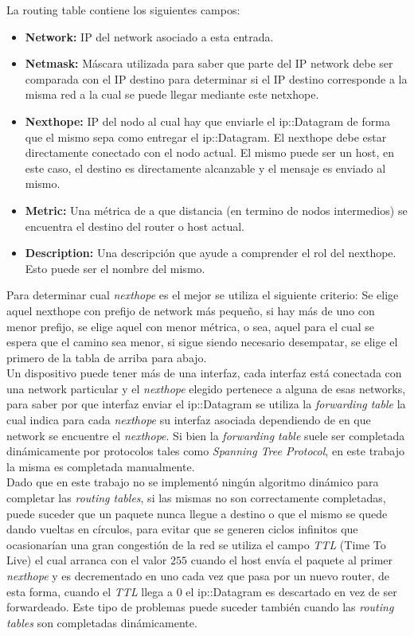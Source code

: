 \documentclass[10pt,a4paper]{article}
\begin{document}
La routing table contiene los siguientes campos:
\begin{itemize}
\item \textbf{Network:} IP del network asociado a esta entrada.
\item \textbf{Netmask:} Máscara utilizada para saber que parte del IP network debe ser comparada con el IP destino para determinar si el IP destino corresponde a la misma red a la cual se puede llegar mediante este netxhope.
\item \textbf{Nexthope:} IP del nodo al cual hay que enviarle el ip::Datagram de forma que el mismo sepa como entregar el ip::Datagram. El nexthope debe estar directamente conectado con el nodo actual. El mismo puede ser un host, en este caso, el destino es directamente alcanzable y el mensaje es enviado al mismo.
\item \textbf{Metric:} Una métrica de a que distancia (en termino de nodos intermedios) se encuentra el destino del router o host actual.
\item \textbf{Description:} Una descripción que ayude a comprender el rol del nexthope. Esto puede ser el nombre del mismo.
\end{itemize}

Para determinar cual \textit{nexthope} es el mejor se utiliza el siguiente criterio: Se elige aquel nexthope con prefijo de network más pequeño, si hay más de uno con menor prefijo, se elige aquel con menor métrica, o sea, aquel para el cual se espera que el camino sea menor, si sigue siendo necesario desempatar, se elige el primero de la tabla de arriba para abajo. \\

Un dispositivo puede tener más de una interfaz, cada interfaz está conectada con una network particular y el \textit{nexthope} elegido pertenece a alguna de esas networks, para saber por que interfaz enviar el ip::Datagram se utiliza la \textit{forwarding table} la cual indica para cada \textit{nexthope} su interfaz asociada dependiendo de en que network se encuentre el \textit{nexthope}. Si bien la \textit{forwarding table} suele ser completada dinámicamente por protocolos tales como \textit{Spanning Tree Protocol}, en este trabajo la misma es completada manualmente. \\

Dado que en este trabajo no se implementó ningún algoritmo dinámico para completar las \textit{routing tables}, si las mismas no son correctamente completadas, puede suceder que un paquete nunca llegue a destino o que el mismo se quede dando vueltas en círculos, para evitar que se generen ciclos infinitos que ocasionarían una gran congestión de la red se utiliza el campo \textit{TTL} (Time To Live) el cual arranca con el valor $255$ cuando el host envía el paquete al primer \textit{nexthope} y es decrementado en uno cada vez que pasa por un nuevo router, de esta forma, cuando el \textit{TTL} llega a $0$ el ip::Datagram es descartado en vez de ser forwardeado. Este tipo de problemas puede suceder también cuando las \textit{routing tables} son completadas dinámicamente. \\
\end{document}
